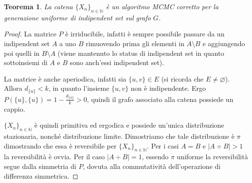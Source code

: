 \documentclass{article}
\theoremstyle{plain}
\newtheorem{thm}{Teorema}
\newcommand{\N}{\mathbb N}
\newcommand{\chain}[1]{\{#1_n\}_{n\in\N}}
\newcommand{\card}[1]{\left|#1\right|}
\renewcommand{\emptyset}{\varnothing}
\begin{document}
\begin{thm}
	La catena $\chain X$ è un algoritmo MCMC corretto per la generazione uniforme di indipendent set sul grafo $G$.
\end{thm}
\begin{proof}
	La matrice $P$ è irriducibile, infatti è sempre possibile passare da un indipendent set $A$ a uno $B$ rimuovendo prima gli elementi in $A\setminus B$ e aggiungendo poi quelli in $B\setminus A$ (viene mantenuto lo status di indipendent set in quanto sottoinsiemi di $A$ e $B$ sono anch'essi indipendent set).

	La matrice è anche aperiodica, infatti sia $\{u,v\}\in E$ (si ricorda che $E\ne\emptyset$). Allora $d_{\{u\}}<k$, in quanto l'insieme $\{u,v\}$ non è indipendente. Ergo $P(\{u\},\{u\})=1-\frac{d_{\{u\}}}{k}>0$, quindi il grafo associato alla catena possiede un cappio.

	$\chain X$ è quindi primitiva ed ergodica e possiede un'unica distribuzione stazionaria, nonché distribuzione limite. Dimostriamo che tale distribuzione è $\pi$ dimostrando che essa è reversibile per $\chain X$. Per i casi $A=B$ e $\card{A\div B}>1$ la reversibilità è ovvia. Per il caso $\card{A\div B}=1$, essendo $\pi$ uniforme la reversibilità segue dalla simmetria di $P$, dovuta alla commutatività dell'operazione di differenza simmetrica.
\end{proof}
\end{document}
